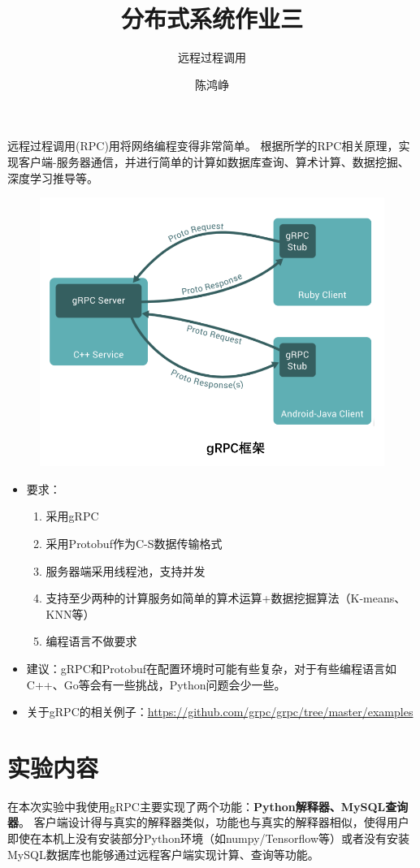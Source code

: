 \documentclass[logo,reportComp]{thesis}
\title{分布式系统作业三}
\subtitle{远程过程调用}
\author{陈鸿峥}
\begin{document}
\maketitle

\begin{question}
远程过程调用(RPC)用将网络编程变得非常简单。
根据所学的RPC相关原理，实现客户端-服务器通信，并进行简单的计算如数据库查询、算术计算、数据挖掘、深度学习推导等。
\begin{figure}[H]
\centering
\includegraphics[width=0.6\linewidth]{fig/gRPC-framework.png}
\end{figure}
\begin{itemize}
\item 要求：
\begin{enumerate}
\item 采用gRPC
\item 采用Protobuf作为C-S数据传输格式
\item 服务器端采用线程池，支持并发
\item 支持至少两种的计算服务如简单的算术运算+数据挖掘算法（K-means、KNN等）
\item 编程语言不做要求
\end{enumerate}
\item 建议：gRPC和Protobuf在配置环境时可能有些复杂，对于有些编程语言如C++、Go等会有一些挑战，Python问题会少一些。
\item 关于gRPC的相关例子：\url{https://github.com/grpc/grpc/tree/master/examples}
\end{itemize}
\end{question}

\section{实验内容}
在本次实验中我使用gRPC主要实现了两个功能：\textbf{Python解释器、MySQL查询器}。
客户端设计得与真实的解释器类似，功能也与真实的解释器相似，使得用户即使在本机上没有安装部分Python环境（如numpy/Tensorflow等）或者没有安装MySQL数据库也能够通过远程客户端实现计算、查询等功能。
\end{document}
